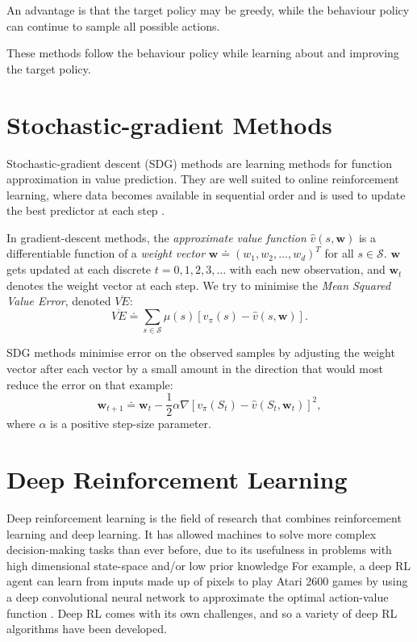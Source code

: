 \documentclass{article}
\begin{document}
An advantage is that the target policy may be greedy, while the
behaviour policy can continue to sample all possible actions.

These methods follow the behaviour policy while learning about and
improving the target policy.

\section{Stochastic-gradient Methods}

Stochastic-gradient descent (SDG) methods are learning methods for function approximation in value prediction. They are well suited to online reinforcement learning, where data becomes available in sequential order and is used to update the best predictor at each step \cite{Mnih2015}.

In gradient-descent methods, the \textit{approximate value function} $\hat{v}(s,\mathbf{w})$ is a differentiable function of a \textit{weight vector} $\mathbf{w} \doteq (w_1, w_2, \dots, w_d)^T$ for all $s \in \mathcal{S}$. $\mathbf{w}$ gets updated at each discrete $t = 0, 1, 2, 3, \dots$ with each new observation, and $\mathbf{w}_t$ denotes the weight vector at each step. We try to minimise the \textit{Mean Squared Value Error}, denoted $\overline{VE}$: $$\overline{VE} \doteq \sum_{s \in \mathcal{S}} \mu(s) \left[ v_\pi(s) - \hat{v}(s, \mathbf{w})\right].$$

SDG methods minimise error on the observed samples by adjusting the weight vector after each vector by a small amount in the direction that would most reduce the error on that example: $$\mathbf{w}_{t+1} \doteq \mathbf{w}_t - \frac{1}{2} \alpha \nabla \left[ v_\pi(S_t) - \hat{v}(S_t, \mathbf{w}_t)\right]^2,$$ where $\alpha$ is a positive step-size parameter.

\section{Deep Reinforcement Learning}

Deep reinforcement learning is the field of research that combines reinforcement learning and deep learning. It has allowed machines to solve more complex decision-making tasks than ever before, due to its usefulness in problems with high dimensional state-space and/or low prior knowledge \cite{DBLP:journals/corr/abs-1811-12560} For example, a deep RL agent can learn from inputs made up of pixels to play Atari 2600 games by using a deep convolutional neural network to approximate the optimal action-value function \cite{Mnih2015}. Deep RL comes with its own challenges, and so a variety of deep RL algorithms have been developed.
\end{document}
